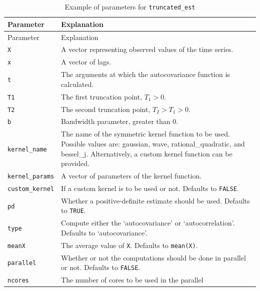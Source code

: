 \protect{}\label{tab:truncated_est_params}
\begin{longtable}[]{@{}
  >{\raggedright\arraybackslash}p{}
  >{\raggedright\arraybackslash}p{}@{}}
\caption{Example of parameters for
\protect\texttt{truncated\_est}}\tabularnewline
\toprule\noalign{}
Parameter & \begin{minipage}[b]{\linewidth}\raggedright
Explanation
\end{minipage} \\
\midrule\noalign{}
\endfirsthead
\toprule\noalign{}
Parameter & \begin{minipage}[b]{\linewidth}\raggedright
Explanation
\end{minipage} \\
\midrule\noalign{}
\endhead
\bottomrule\noalign{}
\endlastfoot
\texttt{X} & A vector representing observed values of the time
series. \\
\texttt{x} & A vector of lags. \\
\texttt{t} & The arguments at which the autocovariance function is
calculated. \\
\texttt{T1} & The first truncation point, \(T_{1} > 0.\) \\
\texttt{T2} & The second truncation point, \(T_{2} > T_{1} > 0.\) \\
\texttt{b} & Bandwidth parameter, greater than 0. \\
\texttt{kernel\_name} & The name of the symmetric kernel function to be
used. Possible values are: gaussian, wave, rational\_quadratic, and
bessel\_j. Alternatively, a custom kernel function can be provided. \\
\texttt{kernel\_params} & A vector of parameters of the kernel
function. \\
\texttt{custom\_kernel} & If a custom kernel is to be used or not.
Defaults to \texttt{FALSE}. \\
\texttt{pd} & Whether a positive-definite estimate should be used.
Defaults to \texttt{TRUE}. \\
\texttt{type} & Compute either the `autocovariance' or
`autocorrelation'. Defaults to `autocovariance'. \\
\texttt{meanX} & The average value of \texttt{X}. Defaults to
\texttt{mean(X)}. \\
\texttt{parallel} & Whether or not the computations should be done in
parallel or not. Defaults to \texttt{FALSE}. \\
\texttt{ncores} & The number of cores to be used in the parallel

\end{longtable}
